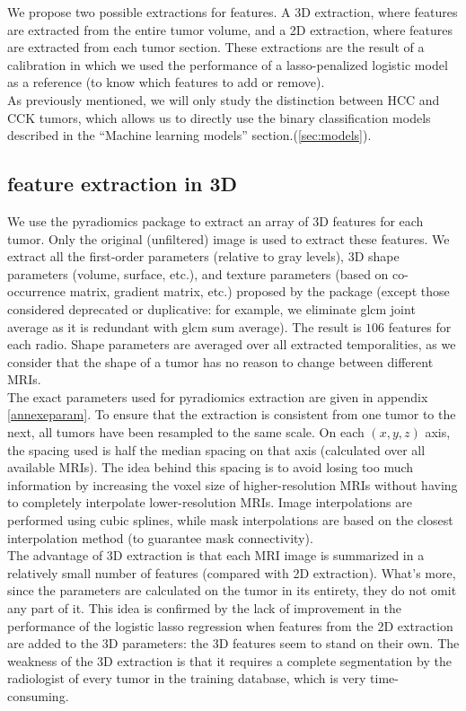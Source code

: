 \documentclass[preprint,12pt]{elsarticle}
\begin{document}
We propose two possible extractions for features. A 3D extraction, where features are extracted from the entire tumor volume, and a 2D extraction, where features are extracted from each tumor section. These extractions are the result of a calibration in which we used the performance of a lasso-penalized logistic model as a reference (to know which features to add or remove).\\
\indent As previously mentioned, we will only study the distinction between HCC and CCK tumors, which allows us to directly use the binary classification models described in the “Machine learning models” section.(\ref{sec:models}). 

\subsection{feature extraction in 3D}
\label{sec:3D}

\noindent We use the pyradiomics package \cite{pyradio} to extract an array of 3D features for each tumor. Only the original (unfiltered) image is used to extract these features. We extract all the first-order parameters (relative to gray levels), 3D shape parameters (volume, surface, etc.), and texture parameters (based on co-occurrence matrix, gradient matrix, etc.) proposed by the package (except those considered deprecated or duplicative: for example, we eliminate glcm joint average as it is redundant with glcm sum average). The result is $106$ features for each radio. Shape parameters are averaged over all extracted temporalities, as we consider that the shape of a tumor has no reason to change between different MRIs.\\
\indent The exact parameters used for pyradiomics extraction are given in appendix \ref{annexeparam}. To ensure that the extraction is consistent from one tumor to the next, all tumors have been resampled to the same scale. On each $(x,y,z)$ axis, the spacing used is half the median spacing on that axis (calculated over all available MRIs). The idea behind this spacing is to avoid losing too much information by increasing the voxel size of higher-resolution MRIs without having to completely interpolate lower-resolution MRIs. Image interpolations are performed using cubic splines, while mask interpolations are based on the closest interpolation method (to guarantee mask connectivity).\\
\indent The advantage of 3D extraction is that each MRI image is summarized in a relatively small number of features (compared with 2D extraction). What's more, since the parameters are calculated on the tumor in its entirety, they do not omit any part of it. This idea is confirmed by the lack of improvement in the performance of the logistic lasso regression when features from the 2D extraction are added to the 3D parameters: the 3D features seem to stand on their own. The weakness of the 3D extraction is that it requires a complete segmentation by the radiologist of every tumor in the training database, which is very time-consuming.
\end{document}
